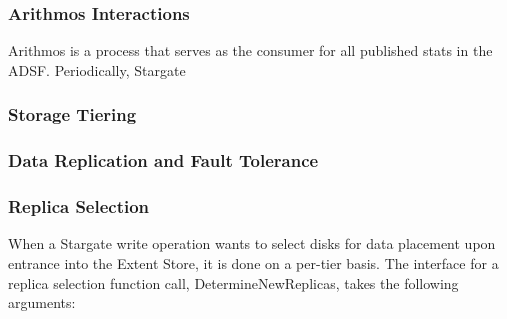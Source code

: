 \documentclass[12pt]{article}
\begin{document}
    \subsubsection{Arithmos Interactions}

    Arithmos is a process that serves as the consumer for all published stats
    in the ADSF. Periodically, Stargate %


    \subsubsection{Storage Tiering}


    \subsubsection{Data Replication and Fault Tolerance}


    \subsubsection{Replica Selection}

    When a Stargate write operation wants to select disks for data placement
    upon entrance into the Extent Store, it is done on a per-tier basis. The
    interface for a replica selection function call, DetermineNewReplicas,
    takes the following arguments:
\end{document}
